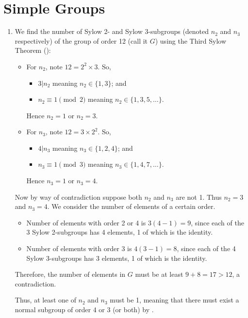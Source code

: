 \section{Simple Groups}
\begin{enumerate}
    \item We find the number of Sylow 2- and Sylow 3-subgroups (denoted $n_2$ and $n_3$ respectively) of the group of order 12 (call it $G$) using the Third Sylow Theorem ():
    \begin{itemize}
        \item For $n_2$, note $12 = 2^2 \times 3$. So,
        \begin{itemize}
            \item $3 \vert n_2$ meaning $n_2 \in \{1, 3\}$; and
            \item $n_2 \equiv 1 \pmod 2$ meaning $n_2 \in \{1, 3, 5, \dots\}$.
        \end{itemize}
        Hence $n_2 = 1$ or $n_2 = 3$.

        \item For $n_3$, note $12 = 3 \times 2^2$. So,
        \begin{itemize}
            \item $4 \vert n_3$ meaning $n_3 \in \{1, 2, 4\}$; and
            \item $n_3 \equiv 1 \pmod 3$ meaning $n_3 \in \{1, 4, 7, \dots\}$.
        \end{itemize}
        Hence $n_3 = 1$ or $n_3 = 4$.
    \end{itemize}

    Now by way of contradiction suppose both $n_2$ and $n_3$ are not 1. Thus $n_2 = 3$ and $n_3 = 4$. We consider the number of elements of a certain order.
    \begin{itemize}
        \item Number of elements with order 2 or 4 is $3(4-1) = 9$, since each of the 3 Sylow 2-subgroups has 4 elements, 1 of which is the identity.
        \item Number of elements with order 3 is $4(3-1) = 8$, since each of the 4 Sylow 3-subgroups has 3 elements, 1 of which is the identity.
    \end{itemize}
    Therefore, the number of elements in $G$ must be at least $9 + 8 = 17 > 12$, a contradiction.

    Thus, at least one of $n_2$ and $n_3$ must be 1, meaning that there must exist a normal subgroup of order 4 or 3 (or both) by .


\end{enumerate}
